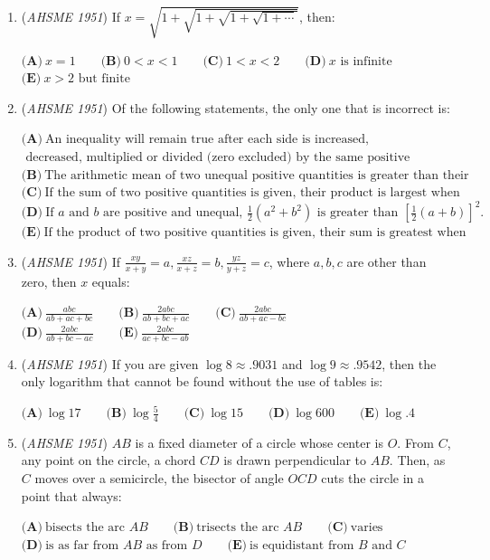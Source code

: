 \begin{enumerate}
	\item (\textit{AHSME 1951}) If $x =\sqrt{1+\sqrt{1+\sqrt{1+\sqrt{1+\cdots}}}}$, then:


 $\textbf{(A)}\ x = 1\qquad\textbf{(B)}\ 0 < x < 1\qquad\textbf{(C)}\ 1 < x < 2\qquad\textbf{(D)}\ x\text{ is infinite}$
$\textbf{(E)}\ x > 2\text{ but finite}$


	\item (\textit{AHSME 1951}) Of the following statements, the only one that is incorrect is:


 $\textbf{(A)}\ \text{An inequality will remain true after each side is increased,}$ $\text{ decreased, multiplied or divided (zero excluded) by the same positive quantity.}$
$\textbf{(B)}\ \text{The arithmetic mean of two unequal positive quantities is greater than their geometric mean.}$
$\textbf{(C)}\ \text{If the sum of two positive quantities is given, their product is largest when they are equal.}$
$\textbf{(D)}\ \text{If }a\text{ and }b\text{ are positive and unequal, }\frac{1}{2}(a^{2}+b^{2})\text{ is greater than }[\frac{1}{2}(a+b)]^{2}.$
$\textbf{(E)}\ \text{If the product of two positive quantities is given, their sum is greatest when they are equal.}$


	\item (\textit{AHSME 1951}) If $\frac{xy}{x+y}= a,\frac{xz}{x+z}= b,\frac{yz}{y+z}= c$, where $a, b, c$ are other than zero, then $x$ equals: 


 $\textbf{(A)}\ \frac{abc}{ab+ac+bc}\qquad\textbf{(B)}\ \frac{2abc}{ab+bc+ac}\qquad\textbf{(C)}\ \frac{2abc}{ab+ac-bc}$
$\textbf{(D)}\ \frac{2abc}{ab+bc-ac}\qquad\textbf{(E)}\ \frac{2abc}{ac+bc-ab}$


	\item (\textit{AHSME 1951}) If you are given $\log 8\approx .9031$ and $\log 9\approx .9542$, then the only logarithm that cannot be found without the use of tables is:


 $\textbf{(A)}\ \log 17\qquad\textbf{(B)}\ \log\frac{5}{4}\qquad\textbf{(C)}\ \log 15\qquad\textbf{(D)}\ \log 600\qquad\textbf{(E)}\ \log .4$


	\item (\textit{AHSME 1951}) $AB$ is a fixed diameter of a circle whose center is $O$. From $C$, any point on the circle, a chord $CD$ is drawn perpendicular to $AB$. Then, as $C$ moves over a semicircle, the bisector of angle $OCD$ cuts the circle in a point that always: 


 $\textbf{(A)}\ \text{bisects the arc }AB\qquad\textbf{(B)}\ \text{trisects the arc }AB\qquad\textbf{(C)}\ \text{varies}$
$\textbf{(D)}\ \text{is as far from }AB\text{ as from }D\qquad\textbf{(E)}\ \text{is equidistant from }B\text{ and }C$



\end{enumerate}

